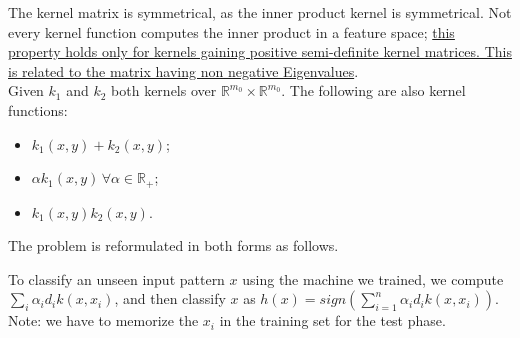The kernel matrix is symmetrical, as the inner product kernel is symmetrical. Not every kernel function computes the inner product in a feature space; \href{https://en.wikipedia.org/wiki/Mercer%27s_theorem}{this property holds only for kernels gaining positive semi-definite kernel matrices. This is related to the matrix having non negative Eigenvalues}. \\
Given $k_1$ and $k_2$ both kernels over $\mathbb{R}^{m_0} \times \mathbb{R}^{m_0}$. The following are also kernel functions:
\begin{itemize}
    \item $k_1(x,y) + k_2(x,y)$;
    \item $\alpha k_1(x,y) \, \forall \alpha \in \mathbb{R}_+$;
    \item $k_1(x,y)k_2(x,y)$.
\end{itemize}
The problem is reformulated in both forms as follows.


To classify an unseen input pattern $x$ using the machine we trained, we compute $\sum_i \alpha_i d_i k(x, x_i)$, and then classify $x$ as $h(x) = sign(\sum_{i=1}^n \alpha_i d_i k(x, x_i))$. Note: we have to memorize the $x_i$ in the training set for the test phase.

